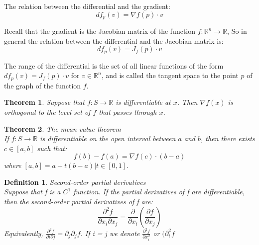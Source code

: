 \documentclass[11pt]{book} %
\newtheorem{theorem}{Theorem}[section]
\newtheorem{definition}{Definition}[section]
\begin{document}
\bigbreak

The relation between the differential and the gradient: \\  
\begin{equation}
    df_p(v) = \nabla f(p) \cdot v
\end{equation}

Recall that the gradient is the Jacobian matrix of the function \( f: \mathbb{R}^n \to \mathbb{R} \), 
So in general the relation between the differential and the Jacobian matrix is:
\begin{equation}
    df_p(v) = J_f(p) \cdot v
\end{equation}

The range of the differential is the set of all linear functions of the form \( df_p(v) = J_f(p) \cdot v \) for \( v \in \mathbb{R}^n \),
and is called the tangent space to the point \( p \) of the graph of the function \( f \).

\bigbreak

\begin{theorem}
Suppose that $f: S \rightarrow \mathbb{R}$ is differentiable at $x$. Then $\nabla f(x)$ is orthogonal to the level set of $f$ that passes through $x$.    
\end{theorem}

\bigbreak

\begin{theorem}{The mean value theorem} \\
If $f: S \rightarrow \mathbb{R}$ is differentiable on the open interval between $a$ and $b$, then there exists $c \in [a,b]$ such that:
\begin{equation}
    f(b) - f(a) = \nabla f(c) \cdot (b-a)
\end{equation}
where $[a,b] = {a + t(b-a) | t \in [0,1]}$.
\end{theorem}

\bigbreak

\begin{definition}{Second-order partial derivatives} \\
Suppose that f is a $C^1$ function. If the partial derivatives of f are differentiable, then the second-order partial derivatives of f are:
\begin{equation}
    \frac{\partial^2 f}{\partial x_i \partial x_j} = \frac{\partial}{\partial x_i} \left( \frac{\partial f}{\partial x_j} \right) 
\end{equation}
Equivalently, $\frac{\partial^2 f}{\partial i \partial j} = \partial_j \partial_j f$.
If i = j we denote $\frac{\partial^2 f}{\partial x_i^2}$ or $(\partial_i^2 f$
\end{definition}
\end{document}
